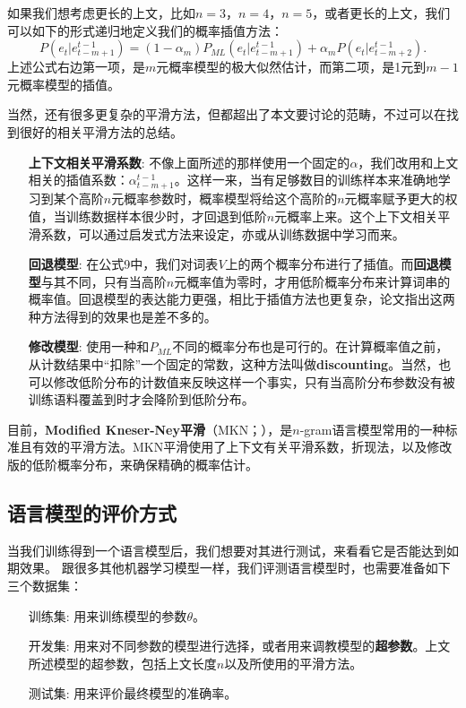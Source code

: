\documentclass[10pt,a4paper]{ctexart}
\begin{document}
如果我们想考虑更长的上文，比如$n=3$，$n=4$，$n=5$，或者更长的上文，我们可以如下的形式递归地定义我们的概率插值方法：
\[
 P(e_t|e_{t-m+1}^{t-1}) = (1 - \alpha_{m})P_{ML}(e_t|e_{t-m+1}^{t-1}) + \alpha_{m}P(e_t|e_{t-m+2}^{t-1}).
\]
上述公式右边第一项，是$m$元概率模型的极大似然估计，而第二项，是1元到$m-1$元概率模型的插值。

当然，还有很多更复杂的平滑方法，但都超出了本文要讨论的范畴，不过可以在\cite{chen1996empirical}找到很好的相关平滑方法的总结。

\begin{enumerate}
\item[\textbf{上下文相关平滑系数}:] 不像上面所述的那样使用一个固定的$\alpha$，我们改用和上文相关的插值系数：$\alpha_{t-m+1}^{t-1}$。这样一来，当有足够数目的训练样本来准确地学习到某个高阶$n$元概率参数时，概率模型将给这个高阶的$n$元概率赋予更大的权值，当训练数据样本很少时，才回退到低阶$n$元概率上来。这个上下文相关平滑系数，可以通过启发式方法来设定\cite{witten1991zero}，亦或从训练数据中学习而来\cite{neubig2016generalizing}。
\item[\textbf{回退模型}:] 在公式9中，我们对词表$V$上的两个概率分布进行了插值。而\textbf{回退模型}与其不同，只有当高阶$n$元概率值为零时，才用低阶概率分布来计算词串的概率值。回退模型的表达能力更强，相比于插值方法也更复杂，论文\cite{goodman2001bit}指出这两种方法得到的效果也是差不多的\cite{goodman2001bit}。
\item[\textbf{修改模型}:] 使用一种和$P_{ML}$不同的概率分布也是可行的。在计算概率值之前，从计数结果中“扣除”一个固定的常数，这种方法叫做\textbf{discounting}。当然，也可以修改低阶分布的计数值来反映这样一个事实，只有当高阶分布参数没有被训练语料覆盖到时才会降阶到低阶分布。
\end{enumerate}
目前，\textbf{Modified Kneser-Ney平滑}（MKN；\cite{chen1996empirical}），是$n$-gram语言模型常用的一种标准且有效的平滑方法。MKN平滑使用了上下文有关平滑系数，折现法，以及修改版的低阶概率分布，来确保精确的概率估计。

\subsection{语言模型的评价方式}
当我们训练得到一个语言模型后，我们想要对其进行测试，来看看它是否能达到如期效果。
跟很多其他机器学习模型一样，我们评测语言模型时，也需要准备如下三个数据集：
\begin{enumerate}
\item[训练集:] 用来训练模型的参数$\theta$。
\item[开发集:] 用来对不同参数的模型进行选择，或者用来调教模型的\textbf{超参数}。上文所述模型的超参数，包括上文长度$n$以及所使用的平滑方法。
\item[测试集:] 用来评价最终模型的准确率。
\end{enumerate}
\end{document}
